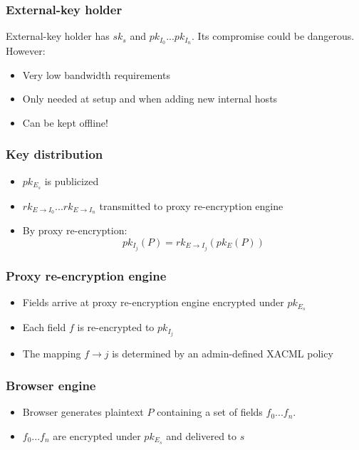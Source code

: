 \documentclass{beamer}
\begin{document}
\begin{frame}
\frametitle{External-key holder}
External-key holder has $sk_s$ and $pk_{I_0}...pk_{I_n}$.  Its compromise could
be dangerous.  However:
\smallskip
\begin{itemize}
\item Very low bandwidth requirements
\item Only needed at setup and when adding new internal hosts
\item Can be kept offline!
\end{itemize}
\end{frame}

\begin{frame}
\frametitle{Key distribution}
\begin{itemize}
\item $pk_{E_s}$ is publicized
\item $rk_{E \to I_0}...rk_{E \to I_n}$ transmitted to \alert{proxy
re-encryption engine}
\item By proxy re-encryption:
\begin{equation*}
pk_{I_j}(P) = rk_{E \to I_j}( pk_E (P))
\end{equation*}
\end{itemize}
\end{frame}

\begin{frame}
\frametitle{Proxy re-encryption engine}
\begin{itemize}
\item Fields arrive at proxy re-encryption engine encrypted under $pk_{E_s}$
\item Each field $f$ is re-encrypted to $pk_{I_j}$
\item The mapping $f \to j$ is determined by an admin-defined XACML policy
\end{itemize}
\end{frame}

\begin{frame}
\frametitle{Browser engine}
\begin{itemize}
\item \alert{Browser} generates plaintext $P$ containing a set of fields
$f_0...f_n$.
\item $f_0...f_n$ are encrypted under $pk_{E_s}$ and delivered to $s$
\end{itemize}
\end{frame}

\end{document}
